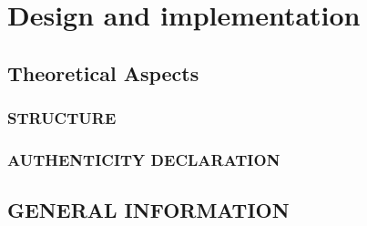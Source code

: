 \chapter{Design and implementation}\label{section:theory}
\thispagestyle{pagestyle}


\section{Theoretical Aspects}
\subsection{STRUCTURE} \label{section:structure}

\subsection{AUTHENTICITY DECLARATION}

\section{GENERAL INFORMATION}
